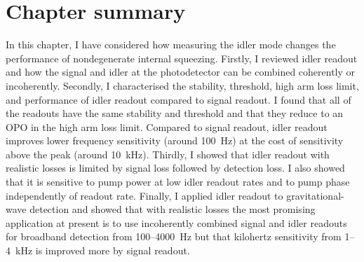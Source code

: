 \section{Chapter summary}

In this chapter, I have considered how measuring the idler mode changes the performance of nondegenerate internal squeezing. %
Firstly, I reviewed idler readout and how the signal and idler at the photodetector can be combined coherently or incoherently. %
Secondly, I characterised the stability, threshold, high arm loss limit, and performance of idler readout compared to signal readout. I found that all of the readouts have the same stability and threshold and that they reduce to an OPO in the high arm loss limit. Compared to signal readout, idler readout improves lower frequency sensitivity (around 100~Hz) at the cost of sensitivity above the peak (around 10~kHz).
Thirdly, I showed that idler readout with realistic losses is limited by signal loss followed by detection loss. I also showed that it is sensitive to pump power at low idler readout rates and to pump phase independently of readout rate.
Finally, I applied idler readout to gravitational-wave detection and showed that with realistic losses the most promising application at present is to use incoherently combined signal and idler readouts for broadband detection from 100--4000~Hz but that kilohertz sensitivity from 1--4~kHz is improved more by signal readout. 



